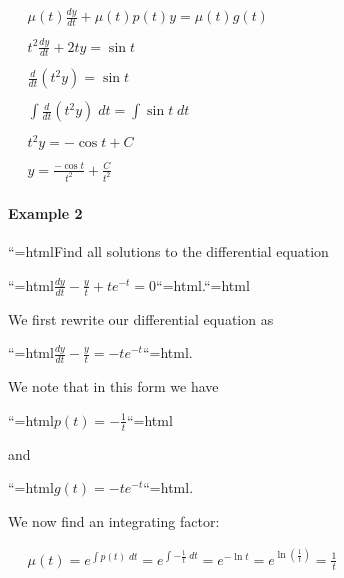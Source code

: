 $\begin{aligned} \quad \mu (t) \frac{dy}{dt} + \mu (t) p(t) y = \mu (t) g(t) \\\\ \quad t^2 \frac{dy}{dt} + 2t y = \sin t \\\\ \quad \frac{d}{dt} \left ( t^2 y \right ) = \sin t \\\\ \quad \int \frac{d}{dt} \left ( t^2 y \right ) \; dt = \int \sin t \; dt \\\\ \quad t^2 y = -\cos t + C \\\\ \quad y = \frac{-\cos t}{t^2} + \frac{C}{t^2} \end{aligned}$







\paragraph{Example 2}



``{=html}Find all solutions to the differential equation

``{=html}$\frac{dy}{dt} - \frac{y}{t} + te^{-t} = 0$``{=html}.``{=html}



We first rewrite our differential equation as

``{=html}$\frac{dy}{dt} - \frac{y}{t} = - te^{-t}$``{=html}.

We note that in this form we have

``{=html}$p(t) = - \frac{1}{t}$``{=html}

and

``{=html}$g(t) = -t e^{-t}$``{=html}.

We now find an integrating factor:







$\begin{aligned} \quad \mu (t) = e^{\int p(t) \; dt} = e^{\int -\frac{1}{t} \; dt} = e^{-\ln t} = e^{\ln \left ( \frac{1}{t} \right)} = \frac{1}{t} \end{aligned}$







